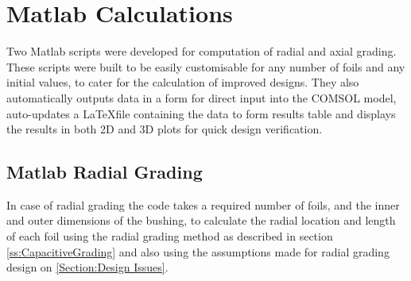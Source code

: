 \section{Matlab Calculations}
Two Matlab scripts were developed for computation of radial and axial grading. 
These scripts were built to be easily customisable for any number of foils and any initial values, to cater for the calculation of improved designs. 
They also automatically outputs data in a form for direct input into the COMSOL model, auto-updates a \LaTeX  file containing the data to form results table and displays the results in both 2D and 3D plots for quick design verification.

\subsection{Matlab Radial Grading}
In case of radial grading  the code takes a required number of foils, and the inner and outer dimensions of the bushing, to calculate the radial location and length of each foil using the radial grading method as described in section \ref{ss:CapacitiveGrading} and also using the assumptions made for radial grading design on \ref{Section:Design Issues}. 


